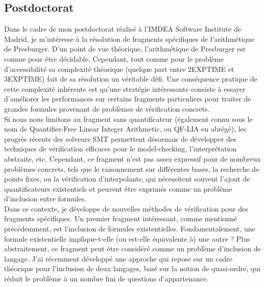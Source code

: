 \subsection*{Postdoctorat}
\vspace{10pt}

Dans le cadre de mon postdoctorat réalisé à l'IMDEA Software Institute de
Madrid, je m'intéresse à la résolution de fragments spécifiques de
l'arithmétique de Presburger. D'un point de vue théorique, l'arithmétique de
Presburger est connue pour être décidable. Cependant, tout comme pour le
problème d'accessibilité sa complexité théorique (quelque part entre 2EXPTIME et
3EXPTIME) fait de sa résolution un véritable défi. Une conséquence pratique de
cette \og complexité inhérente \fg est qu'une stratégie intéressante consiste à
essayer d'améliorer les performances sur certains fragments particuliers pour
traiter de grandes formules provenant de problèmes de vérification concrets.\\

Si nous nous limitons au fragment sans quantificateur (également connu sous le
nom de Quantifier-Free Linear Integer Arithmetic, ou QF-LIA en abrégé), les
progrès récents des solveurs SMT permettent désormais de développer des
techniques de vérification efficaces pour le model-checking, l'interprétation
abstraite, etc. Cependant, ce fragment n'est pas assez expressif pour de
nombreux problèmes concrets, tels que le raisonnement sur différentes bases, la
recherche de points fixes, ou la vérification d'interpolants, qui nécessitent
souvent l'ajout de quantificateurs existentiels et peuvent être exprimés comme un
problème d'inclusion entre formules.\\

Dans ce contexte, je développe de nouvelles méthodes de vérification pour
des fragments spécifiques. Un premier fragment intéressant, comme mentionné
précédemment, est l'inclusion de formules existentielles. Fondamentalement,
une formule existentielle implique-t-elle (ou est-elle équivalente à) une autre
? Plus abstraitement, ce fragment peut être considéré comme un problème
d'inclusion de langage.  J'ai récemment développé une approche qui repose sur
un cadre théorique pour l'inclusion de deux langages, basé sur la notion de
quasi-ordre, qui réduit le problème à un nombre fini de questions
d'appartenance. 

